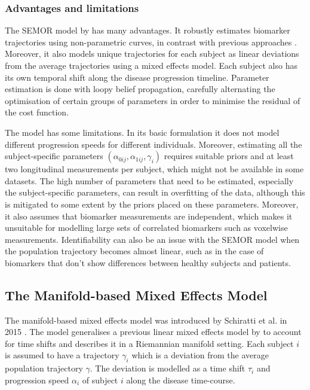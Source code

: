 \subsubsection{Advantages and limitations}

The SEMOR model by \cite{donohue2014estimating} has many advantages. It robustly estimates biomarker trajectories using non-parametric curves, in contrast with previous approaches \cite{jedynak2012computational, fonteijn2012event}. Moreover, it also models unique trajectories for each subject as linear deviations from the average trajectories using a mixed effects model. Each subject also has its own temporal shift along the disease progression timeline. Parameter estimation is done with loopy belief propagation, carefully alternating the optimisation of certain groups of parameters in order to minimise the residual of the cost function.

The model has some limitations. In its basic formulation it does not model different progression speeds for different individuals. Moreover, estimating all the subject-specific parameters $(\alpha_{0ij}, \alpha_{1ij}, \gamma_i)$ requires suitable priors and at least two longitudinal measurements per subject, which might not be available in some datasets. The high number of parameters that need to be estimated, especially the subject-specific parameters, can result in overfitting of the data, although this is mitigated to some extent by the priors placed on these parameters. Moreover, it also assumes that biomarker measurements are independent, which makes it unsuitable for modelling large sets of correlated biomarkers such as voxelwise measurements. Identifiability can also be an issue with the SEMOR model when the population trajectory becomes almost linear, such as in the case of biomarkers that don't show differences between healthy subjects and patients.

\subsection{The Manifold-based Mixed Effects Model}
\label{sec:bckMan}

The manifold-based mixed effects model was introduced by Schiratti et al. in 2015 \cite{schiratti2015mixed}. The model generalises a previous linear mixed effects model by \cite{datar2012mixed} to account for time shifts and describes it in a Riemannian manifold setting. Each subject $i$ is assumed to have a trajectory $\gamma_{i}$ which is a deviation from the average population trajectory $\gamma$. The deviation is modelled as a time shift $\tau_i$ and progression speed $\alpha_i$ of subject $i$ along the disease time-course. 

